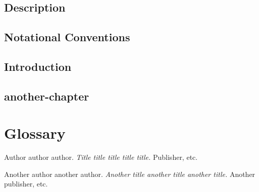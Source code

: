 \documentclass[10pt]{article}
\begin{document}

%
%


%

\pagebreak

\tableofcontents
\newpage

\section*{Description}


\newpage
\section*{Notational Conventions}


\newpage





\section{Introduction}

\newpage
\section{another-chapter}





\appendix            %





\chapter*{Glossary}


\begin{thebibliography}{width of label}

 Author author author.
     {\em Title title title title title.\/}
     Publisher, etc.

     Another author another author.
     {\em Another title another title another title.\/}
     Another publisher, etc.
\end{thebibliography}

\end{document}
